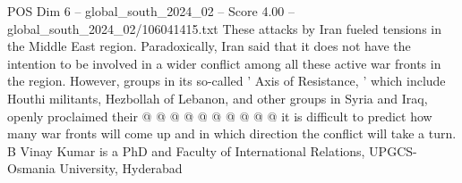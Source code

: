 \begin{textsample}{POS Dim 6 – global\_south\_2024\_02 – Score 4.00 – global\_south\_2024\_02/106041415.txt}
These attacks by Iran fueled tensions in the Middle East region.
Paradoxically, Iran said that it does not have the intention to be involved in a wider conflict among all these active war fronts in the region.
However, groups in its so-called ' Axis of Resistance, ' which include Houthi militants, Hezbollah of Lebanon, and other groups in Syria and Iraq, openly proclaimed their @ @ @ @ @ @ @ @ @ @ it is difficult to predict how many war fronts will come up and in which direction the conflict will take a turn.
B Vinay Kumar is a PhD and Faculty of International Relations, UPGCS-Osmania University, Hyderabad

\end{textsample}
